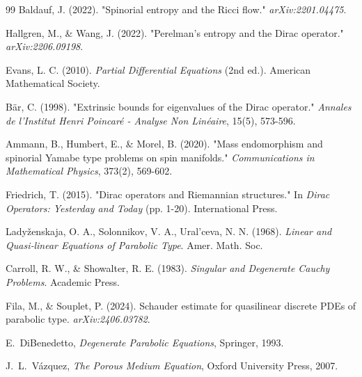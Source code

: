 \documentclass[11pt, reqno, a4paper]{amsart}
\theoremstyle{definition}
\theoremstyle{remark}
\begin{document}
\begin{thebibliography}{99}
Baldauf, J. (2022). "Spinorial entropy and the Ricci flow." \textit{arXiv:2201.04475}.

Hallgren, M., \& Wang, J. (2022). "Perelman's entropy and the Dirac operator." \textit{arXiv:2206.09198}.

Evans, L. C. (2010). \textit{Partial Differential Equations} (2nd ed.). American Mathematical Society.

B\"{a}r, C. (1998). "Extrinsic bounds for eigenvalues of the Dirac operator." \textit{Annales de l'Institut Henri Poincar\'{e} - Analyse Non Lin\'{e}aire}, 15(5), 573-596.

Ammann, B., Humbert, E., \& Morel, B. (2020). "Mass endomorphism and spinorial Yamabe type problems on spin manifolds." \textit{Communications in Mathematical Physics}, 373(2), 569-602. 

Friedrich, T. (2015). "Dirac operators and Riemannian structures." In \textit{Dirac Operators: Yesterday and Today} (pp. 1-20). International Press. 

Ladyženskaja, O. A., Solonnikov, V. A., Ural’ceva, N. N. (1968). \emph{Linear and Quasi‑linear Equations of Parabolic Type}. Amer. Math. Soc.

Carroll, R. W., \& Showalter, R. E. (1983). \textit{Singular and Degenerate Cauchy Problems}. Academic Press.

Fila, M., \& Souplet, P. (2024). Schauder estimate for quasilinear discrete PDEs of parabolic type. \textit{arXiv:2406.03782}.

E.~DiBenedetto, \emph{Degenerate Parabolic Equations}, Springer, 1993.

J.~L.~V{\'a}zquez, \emph{The Porous Medium Equation}, Oxford University Press, 2007.


\end{thebibliography}
\end{document}

